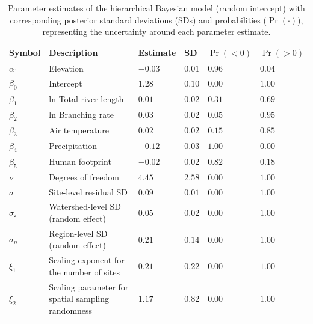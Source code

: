 \begin{table}[ht]
\centering
\caption{Parameter estimates of the hierarchical Bayesian model (random intercept) with corresponding posterior standard deviations (SDs) and probabilities ($\Pr(\cdot)$), representing the uncertainty around each parameter estimate.} 
\label{tab:parms-est1}
\begingroup\small
\begin{tabularx}{\textwidth}{llllll}
  \hline
Symbol & Description & Estimate & SD & $\Pr(< 0)$ & $\Pr(> 0)$ \\ 
  \hline
$\alpha_1$ & Elevation & $-0.03$ & $0.01$ & $0.96$ & $0.04$ \\ 
  $\beta_0$ & Intercept & $1.28$ & $0.10$ & $0.00$ & $1.00$ \\ 
  $\beta_1$ & ln Total river length & $0.01$ & $0.02$ & $0.31$ & $0.69$ \\ 
  $\beta_2$ & ln Branching rate & $0.03$ & $0.02$ & $0.05$ & $0.95$ \\ 
  $\beta_3$ & Air temperature & $0.02$ & $0.02$ & $0.15$ & $0.85$ \\ 
  $\beta_4$ & Precipitation & $-0.12$ & $0.03$ & $1.00$ & $0.00$ \\ 
  $\beta_5$ & Human footprint & $-0.02$ & $0.02$ & $0.82$ & $0.18$ \\ 
  $\nu$ & Degrees of freedom & $4.45$ & $2.58$ & $0.00$ & $1.00$ \\ 
  $\sigma$ & Site-level residual SD & $0.09$ & $0.01$ & $0.00$ & $1.00$ \\ 
  $\sigma_{\varepsilon}$ & Watershed-level SD (random effect) & $0.05$ & $0.02$ & $0.00$ & $1.00$ \\ 
  $\sigma_{\eta}$ & Region-level SD (random effect) & $0.21$ & $0.14$ & $0.00$ & $1.00$ \\ 
  $\xi_{1}$ & Scaling exponent for the number of sites & $0.21$ & $0.22$ & $0.00$ & $1.00$ \\ 
  $\xi_{2}$ & Scaling parameter for spatial sampling randomness & $1.17$ & $0.82$ & $0.00$ & $1.00$ \\ 
   \hline
\end{tabularx}
\endgroup
\end{table}

